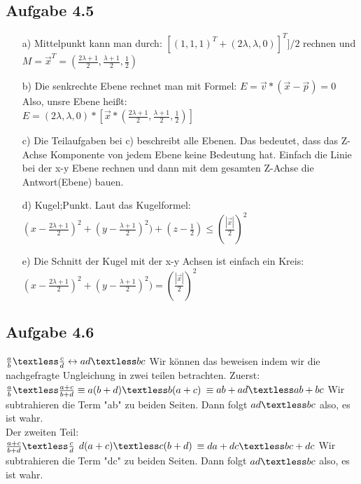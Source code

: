 \documentclass{standalone}
\begin{document}
 

\subsection{Aufgabe 4.5}
\begin{itemize}
	\item[a)] Mittelpunkt kann man durch: 
	$[(1,1,1)^T + (2\lambda,\lambda,0)]^T]/2$ rechnen und $M=\vec{x}^T=(\frac{2\lambda+1}{2},\frac{\lambda+1}{2},\frac{1}{2})$ \\
	\item[b)] Die senkrechte Ebene rechnet man mit Formel: $ E=\vec{v} * (\vec{x}-\vec{p}) = 0 $\\
	Also, unsre Ebene heißt:\\
	$E=(2\lambda,\lambda,0)*[\vec{x}*(\frac{2\lambda+1}{2},\frac{\lambda+1}{2},\frac{1}{2})]$
	\item[c)] Die Teilaufgaben bei c) beschreibt alle Ebenen. Das bedeutet, dass das Z-Achse Komponente von jedem Ebene keine Bedeutung hat. Einfach die Linie bei der x-y Ebene rechnen und dann mit dem gesamten Z-Achse die Antwort(Ebene) bauen.\\
	\item[d)] Kugel;Punkt. Laut das Kugelformel:\\
	$(x-\frac{2\lambda+1}{2})^2 + (y -\frac{\lambda+1}{2})^2) + (z-\frac{1}{2}) \le (\frac{|\vec{x}|}{2})^2$\\
	\item[e)]Die Schnitt der Kugel mit der x-y Achsen ist einfach ein Kreis:\\
	$(x-\frac{2\lambda+1}{2})^2 + (y -\frac{\lambda+1}{2})^2)=(\frac{|\vec{x}|}{2})^2$
\end{itemize}

\subsection{Aufgabe 4.6}
$\frac{a}{b} \textless \frac{c}{d} \leftrightarrow ad \textless bc$ Wir können das beweisen indem wir die nachgefragte Ungleichung in zwei teilen betrachten. Zuerst: \\
$\frac{a}{b} \textless \frac{a+c}{b+d} \equiv a(b+d) \textless b(a+c)$
$\equiv ab+ad \textless ab+bc$ Wir subtrahieren die Term "ab" zu beiden Seiten. Dann folgt $ ad \textless bc$ also, es ist wahr.\\

Der zweiten Teil:\\
$\frac{a+c}{b+d} \textless \frac{c}{d}$
$d(a+c) \textless c(b+d)$
$\equiv da+dc \textless bc+dc $ Wir subtrahieren die Term "dc" zu beiden Seiten. Dann folgt $ ad \textless bc$ also, es ist wahr.\\
\end{document}
